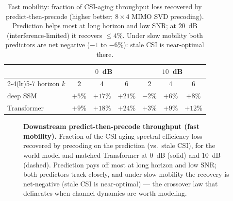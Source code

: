 \documentclass[11pt]{article}
\begin{document}
\begin{table}[h]
\centering
\begin{tabular}{lccc@{\hskip 1.4em}ccc}
\toprule
& \multicolumn{3}{c}{$0$~dB} & \multicolumn{3}{c}{$10$~dB} \\
\cmidrule(lr){2-4}\cmidrule(lr){5-7}
horizon $k$ & 2 & 4 & 6 & 2 & 4 & 6 \\
\midrule
deep SSM & $+5\%$ & $+17\%$ & $+21\%$ & $-2\%$ & $+6\%$ & $+8\%$ \\
Transformer & $+9\%$ & $+18\%$ & $+24\%$ & $+3\%$ & $+9\%$ & $+12\%$ \\
\bottomrule
\end{tabular}
\caption{Fast mobility: fraction of CSI-aging throughput loss recovered by predict-then-precode (higher
better; $8\times4$ MIMO SVD precoding). Prediction helps most at long horizon and low SNR; at $20$~dB
(interference-limited) it recovers $\le\!4\%$. Under slow mobility both predictors are net negative
($-1$ to $-6\%$): stale CSI is near-optimal there.}
\label{tab:tput}
\end{table}

\begin{figure}[t]
\centering
{}
\caption{\textbf{Downstream predict-then-precode throughput (fast mobility).} Fraction of the
CSI-aging spectral-efficiency loss recovered by precoding on the prediction (vs.\ stale CSI), for the
world model and matched Transformer at $0$~dB (solid) and $10$~dB (dashed). Prediction pays off most at
long horizon and low SNR; both predictors track closely, and under slow mobility the recovery is
net-negative (stale CSI is near-optimal) --- the crossover law that delineates when channel dynamics
are worth modeling.}
\label{fig:tput}
\end{figure}
\end{document}
